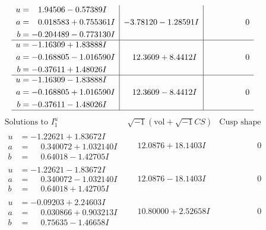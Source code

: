 \documentclass[1p]{elsarticle_modified}
\theoremstyle{definition}
\newcommand{\I}{\sqrt{-1}}
\begin{document}
$$\begin{array}{c|c|c}
\begin{aligned}
u &= \phantom{-}1.94506 - 0.57389 I \\
a &= \phantom{-}0.018583 + 0.755361 I \\
b &= -0.204489 - 0.773130 I\end{aligned}
 & -3.78120 - 1.28591 I & \phantom{-0.000000 } 0 \\ \hline\begin{aligned}
u &= -1.16309 + 1.83888 I \\
a &= -0.168805 - 1.016590 I \\
b &= -0.37611 + 1.48026 I\end{aligned}
 & \phantom{-}12.3609 + 8.4412 I & \phantom{-0.000000 } 0 \\ \hline\begin{aligned}
u &= -1.16309 - 1.83888 I \\
a &= -0.168805 + 1.016590 I \\
b &= -0.37611 - 1.48026 I\end{aligned}
 & \phantom{-}12.3609 - 8.4412 I & \phantom{-0.000000 } 0\\
 \hline 
 \end{array}$$\newpage$$\begin{array}{c|c|c}  
\text{Solutions to }I^u_{1}& \I (\text{vol} + \sqrt{-1}CS) & \text{Cusp shape}\\
 \hline 
\begin{aligned}
u &= -1.22621 + 1.83672 I \\
a &= \phantom{-}0.340072 + 1.032140 I \\
b &= \phantom{-}0.64018 - 1.42705 I\end{aligned}
 & \phantom{-}12.0876 + 18.1403 I & \phantom{-0.000000 } 0 \\ \hline\begin{aligned}
u &= -1.22621 - 1.83672 I \\
a &= \phantom{-}0.340072 - 1.032140 I \\
b &= \phantom{-}0.64018 + 1.42705 I\end{aligned}
 & \phantom{-}12.0876 - 18.1403 I & \phantom{-0.000000 } 0 \\ \hline\begin{aligned}
u &= -0.09203 + 2.24603 I \\
a &= \phantom{-}0.030866 + 0.903213 I \\
b &= \phantom{-}0.75635 - 1.46658 I\end{aligned}
 & \phantom{-}10.80000 + 2.52658 I & \phantom{-0.000000 } 0 \\ \hline\begin{aligned}

\end{aligned}
\end{array}$$
\end{document}
